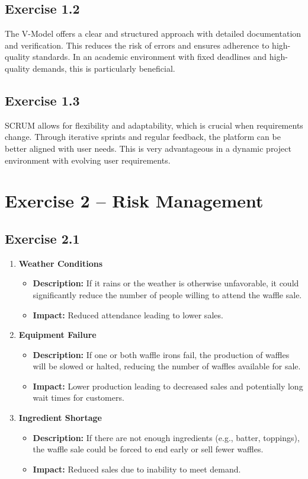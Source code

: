 \documentclass[a4paper]{scrartcl}
\begin{document}
\subsection*{Exercise 1.2}
The V-Model offers a clear and structured approach with detailed documentation and verification. This reduces the risk of errors and ensures adherence to high-quality standards. In an academic environment with fixed deadlines and high-quality demands, this is particularly beneficial.

\subsection*{Exercise 1.3}
SCRUM allows for flexibility and adaptability, which is crucial when requirements change. Through iterative sprints and regular feedback, the platform can be better aligned with user needs. This is very advantageous in a dynamic project environment with evolving user requirements.

\section*{Exercise 2 – Risk Management}
\subsection*{Exercise 2.1}
\begin{enumerate}
    \item \textbf{Weather Conditions}
    \begin{itemize}
        \item \textbf{Description:} If it rains or the weather is otherwise unfavorable, it could significantly reduce the number of people willing to attend the waffle sale.
        \item \textbf{Impact:} Reduced attendance leading to lower sales.
    \end{itemize}
    
    \item \textbf{Equipment Failure}
    \begin{itemize}
        \item \textbf{Description:} If one or both waffle irons fail, the production of waffles will be slowed or halted, reducing the number of waffles available for sale.
        \item \textbf{Impact:} Lower production leading to decreased sales and potentially long wait times for customers.
    \end{itemize}
    
    \item \textbf{Ingredient Shortage}
    \begin{itemize}
        \item \textbf{Description:} If there are not enough ingredients (e.g., batter, toppings), the waffle sale could be forced to end early or sell fewer waffles.
        \item \textbf{Impact:} Reduced sales due to inability to meet demand.
    \end{itemize}
\end{enumerate}
\end{document}
